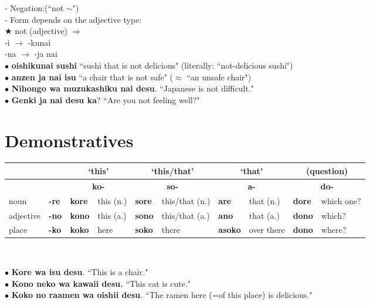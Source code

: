 \documentclass[11pt]{article} %
\newcommand{\ee}{\vspace{.10cm}\\} %
\begin{document}
- Negation:(``not $\sim$")\\
- Form depends on the adjective type:\ee

$\bigstar$ not (adjective) $\Rightarrow$\\
-i $\rightarrow$ -kunai \\
-na $\rightarrow$ -ja nai \ee

$\bullet$ \textbf{oishikunai sushi} ``sushi that is not delicious" (literally: ``not-delicious sushi")\\
$\bullet$ \textbf{anzen ja nai isu} ``a chair that is not safe" ($\approx$ ``an unsafe chair")\\
$\bullet$ \textbf{Nihongo wa muzukashiku nai desu}. ``Japanese is not difficult."\\
$\bullet$ \textbf{Genki ja nai desu ka}?  ``Are you not feeling well?"\\

\section{Demonstratives}

\begin{tabular}{l l||l l | l l | l l | l l}
& & \multicolumn{2}{c}{`this' } & \multicolumn{2}{c}{`this/that'} & \multicolumn{2}{c}{`that'} & \multicolumn{2}{c}{(question)}\\
\hline
& & \multicolumn{2}{c}{\textbf{ko-}} & \multicolumn{2}{c}{\textbf{so-}} & \multicolumn{2}{c}{\textbf{a-}} & \multicolumn{2}{c}{\textbf{do-}}\\
\hline
noun & \textbf{-re}& \textbf{kore} & this (n.) & \textbf{sore} & this/that (n.) & \textbf{are} & that (n.) & \textbf{dore} & which one? \\
adjective & \textbf{-no}& \textbf{kono} & this (a.) & \textbf{sono} & this/that (a.) & \textbf{ano} & that (a.) & \textbf{dono} & which? \\
place & \textbf{-ko}& \textbf{koko} & here & \textbf{soko} & there & \textbf{\textbf{asoko}} & over there & \textbf{dono} & where? \\
\end{tabular}\\\vspace{1cm}

$\bullet$ \textbf{Kore wa isu desu}.  ``This is a chair."\\
$\bullet$ \textbf{Kono neko wa kawaii desu.} ``This cat is cute."\\
$\bullet$ \textbf{Koko no raamen wa oishii desu}. ``The ramen here (=of this place) is delicious."\ee
\end{document}
